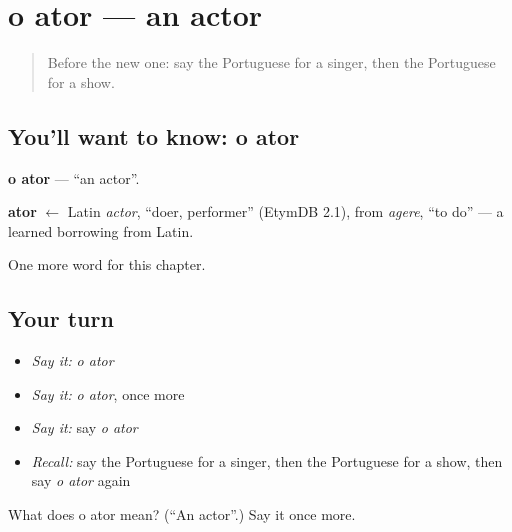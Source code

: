 \section[o ator]{o ator — an actor}

\label{lesson:PT-C159-ator}



\begin{quote}
Before the new one: say the Portuguese for a singer, then the Portuguese for a show.
\end{quote}

\subsection*{You'll want to know: o ator}
\textbf{o ator} — \textquotedblleft{}an actor\textquotedblright{}.

\begin{cousinweb}
\textbf{ator} $\leftarrow$ Latin \emph{actor}, \textquotedblleft{}doer, performer\textquotedblright{} (EtymDB 2.1), from \emph{agere}, \textquotedblleft{}to do\textquotedblright{} — a learned borrowing from Latin.
\end{cousinweb}

\begin{grammarlens}[title={What you've built}]
One more word for this chapter.
\end{grammarlens}

\subsection*{Your turn}
\begin{itemize}
\raggedright
  \item \emph{Say it:} \emph{o ator}
  \item \emph{Say it:} \emph{o ator}, once more
  \item \emph{Say it:} say \emph{o ator}
  \item \emph{Recall:} say the Portuguese for a singer, then the Portuguese for a show, then say \emph{o ator} again
\end{itemize}

\begin{tcolorbox}[breakable,colback=teal!4,colframe=teal!35!black,title={Before you move on}]
What does o ator mean? (\textquotedblleft{}An actor\textquotedblright{}.) Say it once more.
\end{tcolorbox}
